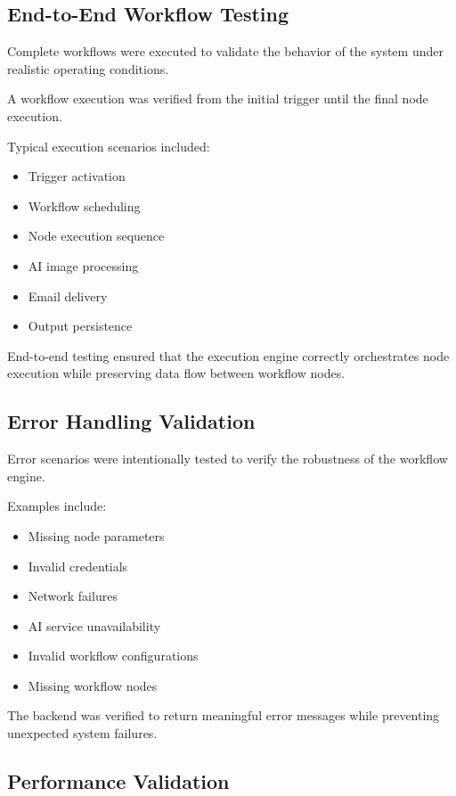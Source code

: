 \subsection{End-to-End Workflow Testing}

Complete workflows were executed to validate the behavior of the system under realistic operating conditions.

A workflow execution was verified from the initial trigger until the final node execution.

Typical execution scenarios included:

\begin{itemize}
    \item Trigger activation
    \item Workflow scheduling
    \item Node execution sequence
    \item AI image processing
    \item Email delivery
    \item Output persistence
\end{itemize}

End-to-end testing ensured that the execution engine correctly orchestrates node execution while preserving data flow between workflow nodes.


\subsection{Error Handling Validation}

Error scenarios were intentionally tested to verify the robustness of the workflow engine.

Examples include:

\begin{itemize}
    \item Missing node parameters
    \item Invalid credentials
    \item Network failures
    \item AI service unavailability
    \item Invalid workflow configurations
    \item Missing workflow nodes
\end{itemize}

The backend was verified to return meaningful error messages while preventing unexpected system failures.


\subsection{Performance Validation}

